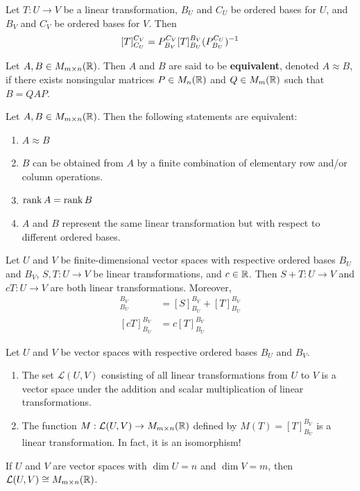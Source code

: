 \begin{theorem}
Let $T: U \to V$ be a linear transformation, $B_U$ and $C_U$ be ordered bases for $U$, and $B_V$ and $C_V$ be ordered bases for $V$. Then
$$[T]_{C_U}^{C_V} = P_{B_V}^{C_V}[T]_{B_U}^{B_V}(P_{B_U}^{C_U})^{-1}$$
\end{theorem}

\begin{definition}
Let $A, B \in M_{m \times n}(\mathbb{R})$. Then $A$ and $B$ are said to be \textbf{equivalent},
denoted $A \approx B$, if there exists nonsingular matrices $P \in M_n(\mathbb{R})$ and 
$Q \in M_m(\mathbb{R})$ such that $B = QAP$.
\end{definition}

\begin{remark}
Let $A, B \in M_{m \times n}(\mathbb{R})$. Then the following statements are equivalent:
\begin{enumerate}
    \item $A \approx B$
    \item $B$ can be obtained from $A$ by a finite combination of elementary row 
    and/or column operations.
    \item $\rank A = \rank B$
    \item $A$ and $B$ represent the same linear transformation but with respect 
    to different ordered bases.
\end{enumerate}
\end{remark}

\begin{theorem}
Let $U$ and $V$ be finite-dimensional vector spaces with respective ordered bases 
$B_U$ and $B_V$, $S, T: U \to V$ be linear transformations, and $c \in \mathbb{R}$. Then 
$S + T: U \to V$ and $cT: U \to V$ are both linear transformations. Moreover,
\begin{align*}
[S + T]_{B_U}^{B_V} &= [S]_{B_U}^{B_V} + [T]_{B_U}^{B_V} \\
[cT]_{B_U}^{B_V} &= c[T]_{B_U}^{B_V}
\end{align*}
\end{theorem}

\begin{remark}
Let $U$ and $V$ be vector spaces with respective ordered bases $B_U$ and $B_V$.
\begin{enumerate}
    \item The set $\mathcal{L}(U, V)$ consisting of all linear transformations 
    from $U$ to $V$ is a vector space under the addition and scalar multiplication 
    of linear transformations.
    \item The function $M: \mathcal{L}(U, V) \to M_{m \times n}(\mathbb{R})$ defined by $M(T) = [T]_{B_U}^{B_V}$ 
    is a linear transformation. In fact, it is an isomorphism!
\end{enumerate}
\end{remark}

\begin{theorem}
If $U$ and $V$ are vector spaces with $\dim U = n$ and $\dim V = m$, then 
$\mathcal{L}(U, V) \cong M_{m \times n}(\mathbb{R})$.
\end{theorem}